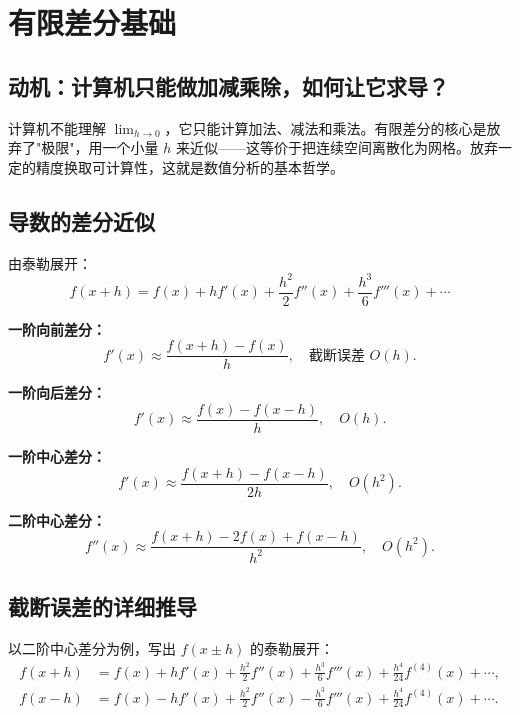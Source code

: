 \section{有限差分基础}
\label{sec:fd_basics}

\subsection*{动机：计算机只能做加减乘除，如何让它求导？}

计算机不能理解 $\lim_{h\to 0}$，它只能计算加法、减法和乘法。有限差分的核心是放弃了"极限"，用一个小量 $h$ 来近似——这等价于把连续空间离散化为网格。放弃一定的精度换取可计算性，这就是数值分析的基本哲学。

\subsection{导数的差分近似}

由泰勒展开：
\begin{equation}
f(x+h) = f(x) + h f'(x) + \frac{h^2}{2}f''(x)
+ \frac{h^3}{6}f'''(x) + \cdots
\end{equation}

\textbf{一阶向前差分：}
\begin{equation}
f'(x) \approx \frac{f(x+h) - f(x)}{h},\quad \text{截断误差 } O(h).
\label{eq:forward_diff}
\end{equation}

\textbf{一阶向后差分：}
\begin{equation}
f'(x) \approx \frac{f(x) - f(x-h)}{h},\quad O(h).
\label{eq:backward_diff}
\end{equation}

\textbf{一阶中心差分：}
\begin{equation}
f'(x) \approx \frac{f(x+h) - f(x-h)}{2h},\quad O(h^2).
\label{eq:central_diff}
\end{equation}

\textbf{二阶中心差分：}
\begin{equation}
f''(x) \approx \frac{f(x+h) - 2f(x) + f(x-h)}{h^2},\quad O(h^2).
\label{eq:second_diff}
\end{equation}

\subsection{截断误差的详细推导}

以二阶中心差分为例，写出 $f(x\pm h)$ 的泰勒展开：
\begin{align}
f(x+h) &= f(x) + hf'(x) + \frac{h^2}{2}f''(x) + \frac{h^3}{6}f'''(x) + \frac{h^4}{24}f^{(4)}(x) + \cdots,\\
f(x-h) &= f(x) - hf'(x) + \frac{h^2}{2}f''(x) - \frac{h^3}{6}f'''(x) + \frac{h^4}{24}f^{(4)}(x) + \cdots.
\end{align}

